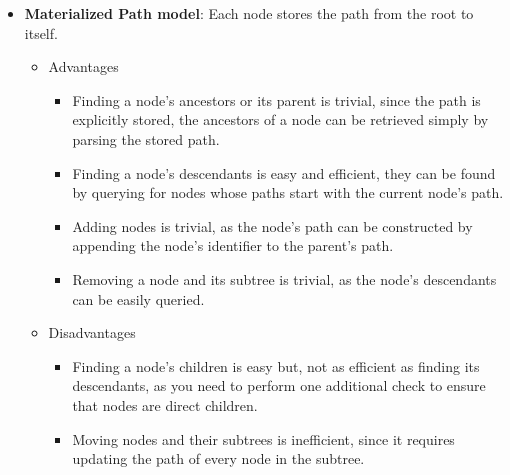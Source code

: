 \begin{itemize}
\begin{itemize}
  \item \textbf{Materialized Path model}: Each node stores the path from the root to itself.
    \begin{itemize}
      \item Advantages
        \begin{itemize}
        \item Finding a node’s ancestors or its parent is trivial, since the path is explicitly stored,
          the ancestors of a node can be retrieved simply by parsing the stored path.
        \item Finding a node’s descendants is easy and efficient, they can be found by
          querying for nodes whose paths start with the current node's path.
        \item Adding nodes is trivial, as the node's path can be constructed by appending
          the node's identifier to the parent's path.
        \item Removing a node and its subtree is trivial, as the node's descendants can be
          easily queried.
      \end{itemize}
      \item Disadvantages
        \begin{itemize}
          \item Finding a node's children is easy but, not as efficient as finding its
            descendants, as you need to perform one additional check to ensure that nodes
            are direct children.
        \item Moving nodes and their subtrees is inefficient, since it requires updating
          the path of every node in the subtree. 
        \end{itemize}
    \end{itemize}
\end{itemize}


\newcommand{\goodcomplexity}[1]{\vspace{.4em}\textcolor{darkgreen}{\checkmark}\vspace{.4em}}
\newcommand{\mediumcomplexity}[1]{\vspace{.4em}\textcolor{orange}{\textcircled{}}\vspace{.4em}}
\newcommand{\badcomplexity}[1]{\vspace{.4em}\textcolor{red}{X}\vspace{.4em}}


\end{itemize}

